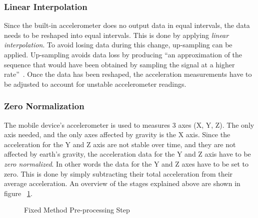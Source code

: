 \documentclass{sig-alternate}
\begin{document}
\subsubsection{Linear Interpolation} 
	Since the built-in accelerometer does no output data in equal intervals, the data needs to be reshaped into equal intervals. This is done by applying \textit{linear interpolation}. To avoid losing data during this change, up-sampling can be applied. Up-sampling avoids data loss by producing ``an approximation of the sequence that would have been obtained by sampling the signal at a higher rate''~\cite{wiki1:2014}. Once the data has been reshaped, the acceleration measurements have to be adjusted to account for unstable accelerometer readings. 
\subsubsection{Zero Normalization}
	The mobile device's accelerometer is used to measures 3 axes (X, Y, Z). The only axis needed, and the only axes affected by gravity is the X axis. Since the acceleration for the Y and Z axis are not stable over time, and they are not affected by earth's gravity, the acceleration data for the Y and Z axis have to be \textit{zero normalized}. In other words the data for the Y and Z axes have to be set to zero. This is done by simply subtracting their total acceleration from their average acceleration. An overview of the stages explained above are shown in figure ~\ref{fig:firstStep}.
	
\begin{figure}
\centering
{}
\caption{Fixed Method Pre-processing Step}
\label{fig:firstStep}
\end{figure}
\end{document}

